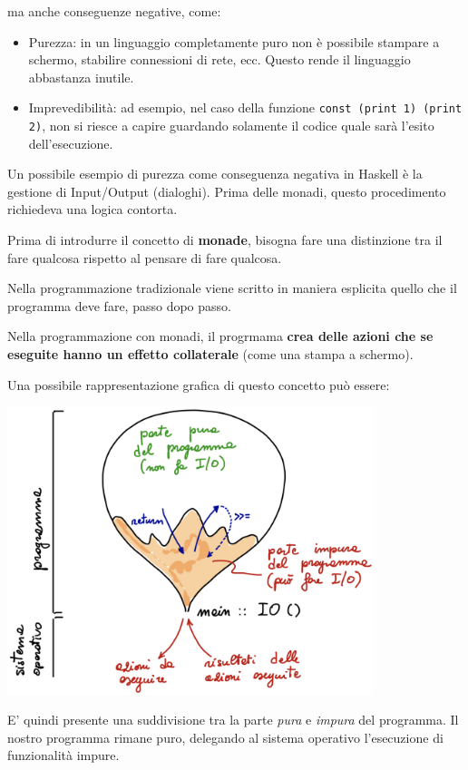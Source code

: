 \documentclass{article}
\begin{document}
ma anche conseguenze negative, come:
\begin{itemize}
    \item Purezza: in un linguaggio completamente puro non è possibile stampare a schermo, stabilire connessioni di rete, ecc. Questo rende il linguaggio abbastanza inutile.
    \item Imprevedibilità: ad esempio, nel caso della funzione \texttt{const (print 1) (print 2)}, non si riesce a capire guardando solamente il codice quale sarà l'esito dell'esecuzione.
\end{itemize}

Un possibile esempio di purezza come conseguenza negativa in Haskell è la gestione di Input/Output (dialoghi). Prima delle monadi, questo procedimento richiedeva una logica contorta.

\pagebreak

Prima di introdurre il concetto di \textbf{monade}, bisogna fare una distinzione tra il fare qualcosa rispetto al pensare di fare qualcosa.

Nella programmazione tradizionale viene scritto in maniera esplicita quello che il programma deve fare, passo dopo passo.

Nella programmazione con monadi, il progrmama \textbf{crea delle azioni che se eseguite hanno un effetto collaterale} (come una stampa a schermo).

Una possibile rappresentazione grafica di questo concetto può essere:\\
\begin{center}
    \includegraphics[width=0.8\textwidth]{img/monadi.png}
\end{center}

E' quindi presente una suddivisione tra la parte \textit{pura} e \textit{impura} del programma. Il nostro programma rimane puro, delegando al sistema operativo l'esecuzione di funzionalità impure.
\end{document}
